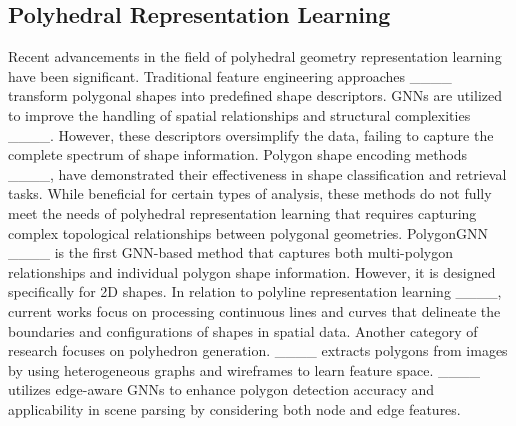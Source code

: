 \subsection{Polyhedral Representation Learning}
Recent advancements in the field of polyhedral geometry representation learning have been significant. Traditional feature engineering approaches ____  transform polygonal shapes into predefined shape descriptors. GNNs are utilized to improve the handling of spatial relationships and structural complexities ____. However, these descriptors oversimplify the data, failing to capture the complete spectrum of shape information.  Polygon shape encoding methods ____, have demonstrated their effectiveness in shape classification and retrieval tasks. While beneficial for certain types of analysis, these methods do not fully meet the needs of polyhedral representation learning that requires capturing complex topological relationships between polygonal geometries. PolygonGNN ____ is the first GNN-based method that captures both multi-polygon relationships and individual polygon shape information. However, it is designed specifically for 2D shapes. In relation to polyline representation learning ____, current works focus on processing continuous lines and curves that delineate the boundaries and configurations of shapes in spatial data.  Another category of research focuses on polyhedron generation. ____ extracts polygons from images by using heterogeneous graphs and wireframes to learn feature space. ____ utilizes edge-aware GNNs to enhance polygon detection accuracy and applicability in scene parsing by considering both node and edge features. 

